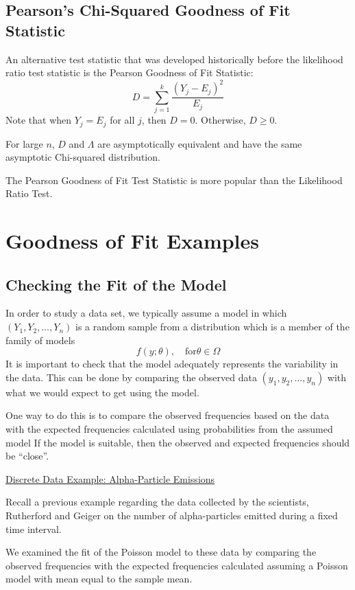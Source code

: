 \documentclass[oneside]{book}
\begin{document}
\subsection{Pearson's Chi-Squared Goodness of Fit Statistic}

An alternative test statistic that was developed historically before the likelihood ratio
test statistic is the Pearson Goodness of Fit Statistic:
\[
    D=\sum_{j=1}^{k} \frac{\left(Y_{j}-E_{j}\right)^{2}}{E_{j}}
\]
Note that when $Y_{j}=E_{j}$ for all $j$, then $D=0$.
Otherwise, $D \geq 0$.

For large $ n $, $ D $ and $ \Lambda $ are asymptotically equivalent and have the
same asymptotic Chi-squared distribution.

The Pearson Goodness of Fit Test Statistic is more popular than the Likelihood Ratio Test.

\section{Goodness of Fit Examples}
\subsection{Checking the Fit of the Model}
In order to study a data set, we typically assume a model in which $\left(Y_{1}, Y_{2}, \ldots, Y_{n}\right)$ is a random sample from a distribution which is a member of the family of models
\[
    f(y ; \theta), \quad \text{for} \theta \in \Omega
\]
It is important to check that the model adequately represents the variability in the data.
This can be done by comparing the observed data $\left(y_{1}, y_{2}, \ldots, y_{n}\right)$ with what we would expect to get using the model.

One way to do this is to compare the observed frequencies based on the data with the expected frequencies calculated using probabilities from the assumed model
If the model is suitable, then the observed and expected frequencies should be ``close''.

\underline{Discrete Data Example: Alpha-Particle Emissions}

Recall a previous example regarding the data collected by the scientists, Rutherford and Geiger on the number of alpha-particles emitted during a fixed time interval.

We examined the fit of the Poisson model to these data by comparing the observed frequencies with the expected frequencies calculated assuming a Poisson model with mean equal to the sample mean.
\end{document}
